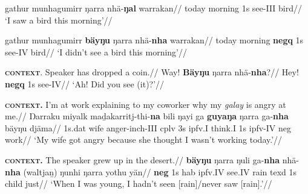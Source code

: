 \a\begingl\gla gathur munhagumirr ŋarra nhä-\textbf{ŋal} warrakan//
\glb today morning 1s see-\gls{III} bird//
\glft`I saw a bird this morning'\trailingcitation{[FW 20180802]}//\endgl


\a\begingl\gla gathur munhagumirr \textbf{bäyŋu} ŋarra nhä-\textbf{nha} warrakan//
\glb today morning \textbf{\gls{negq}} 1s see-\gls{IV} bird//
\glft`I didn't see a bird this morning'\trailingcitation{[FW 20180802]}//\endgl

\a\begingl\glpreamble \textsc{\textbf{context}.} Speaker has dropped a coin.//
\gla Way! \textbf{Bäyŋu} ŋarra nhä-\textbf{nha}?//
\glb Hey! \textbf{\gls{negq}} 1s see-\gls{IV}//
\glft`Ah! Did you see (it)?'\trailingcitation{[AW 20180830]}//\endgl


\a\begingl\glpreamble\textbf{\textsc{context.}} I'm at work explaining to my coworker why my \textit{galay} is angry at me.//
\gla Ŋarraku miyalk maḏakarritj-thi-\textbf{na} bili ŋayi ga \textbf{guyaŋa} ŋarra ga-\textbf{nha} bäyŋu djäma//
\glb 1s.\gls{dat} wife anger-\gls{inch}-\gls{III} \gls{cplv} 3s \gls{ipfv}.\gls{I} think.\gls{I}\footnotemark{} 1s \gls{ipfv}-\gls{IV} \gls{neg} work//
\glft`My wife got angry because she thought I wasn't working today.'\trailingcitation{[DhG~20190417]}//\endgl

\a\begingl\glpreamble \textbf{\textsc{context.}} The speaker grew up in the desert.//
\gla \textbf{bäyŋu} ŋarra ŋuli ga-\textbf{nha} nhä-\textbf{nha} (waltjaṉ) ŋunhi ŋarra yothu yän//
\glb \textbf{\gls{neg}} 1s 	\gls{hab} \gls{ipfv}.\gls{IV} see.\gls{IV} rain \gls{texd} 1s child just//
\glft`When I was young, I hadn't seen [rain]/never saw [rain].'\trailingcitation{[AW~20190501]}//\endgl\xe


